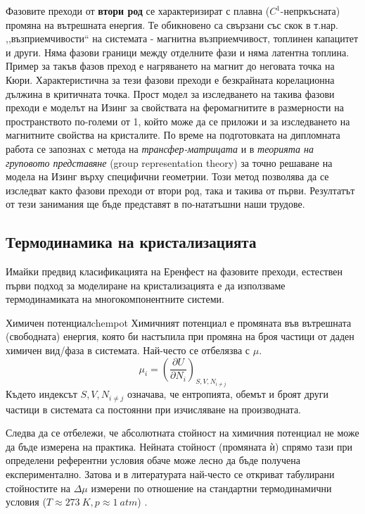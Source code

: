 Фазовите преходи от \textbf{втори род} се характеризират с плавна ($C^1$-не\-пр\-къс\-на\-та) промяна на вътрешната енергия. Те обикновено са свързани със скок в т.нар. ,,възприемчивости`` на системата - магнитна възприемчивост, топлинен капацитет и други. Няма фазови граници между отделните фази и няма латентна топлина. Пример за такъв фазов преход е нагряването на магнит до неговата точка на Кюри. Характеристична за тези фазови преходи е безкрайната корелационна дължина в критичната точка. Прост модел за изследването на такива фазови преходи е моделът на Изинг за свойствата на феромагнитите в размерности на пространството по-големи от 1, който може да се приложи и за изследването на магнитните свойства на кристалите. По време на подготовката на дипломната работа се запознах с метода на \textit{трансфер-матрицата} и в \textit{теорията на груповото представяне} (group representation theory) за точно решаване на модела на Изинг върху специфични геометрии. Този метод позволява да се изследват както фазови преходи от втори род, така и такива от първи. Резултатът от тези занимания ще бъде представят в по-нататъшни наши трудове.

\subsection{Термодинамика на кристализацията}
\label{sub:thermodynamics}
Имайки предвид класификацията на Еренфест на фазовите преходи, естествен първи подход за моделиране на кристализацията е да използваме термодинамиката на многокомпонентните системи.

\begin{definition}{Химичен потенциал}{chempot}
    Химичният потенциал е промяната във вътрешната (свободната) енергия, която би настъпила при промяна на броя частици от даден химичен вид/фаза в системата. Най-често се отбелязва с $\mu$.
	\begin{equation}
		\label{eq:chempot}
		\mu_i = \left(\frac{\partial U}{\partial N_i}\right)_{S, V, N_{i \ne j}}
	\end{equation}
	Където индексът $S, V, N_{i \ne j}$ означава, че ентропията, обемът и броят други частици в системата са постоянни при изчисляване на производната.
\end{definition}

\noindent Следва да се отбележи, че абсолютната стойност на химичния потенциал не може да бъде измерена на практика. Нейната стойност (промяната ѝ) спрямо тази при определени референтни условия обаче може лесно да бъде получена експериментално. Затова и в литературата най-често се откриват табулирани стойностите на $\Delta \mu$ измерени по отношение на стандартни термодинамични условия ($T \approx 273~K, p \approx 1~atm$) \cite{IvanMarkovCGB}\cite{atkinspaula2008}.


